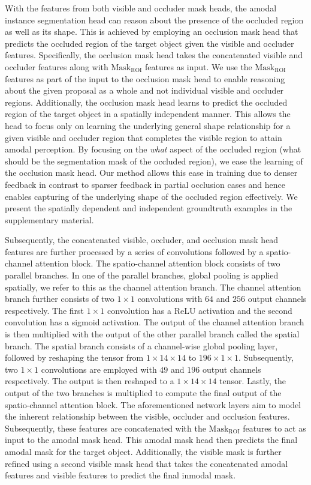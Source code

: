 \documentclass[10pt,twocolumn,letterpaper]{article}
\begin{document}
With the features from both visible and occluder mask heads, the amodal instance segmentation head can reason about the presence of the occluded region as well as its shape. This is achieved by employing an occlusion mask head that predicts the occluded region of the target object given the visible and occluder features. Specifically, the occlusion mask head takes the concatenated visible and occluder features along with $\text{Mask}_{\text{ROI}}$ features as input. We use the $\text{Mask}_{\text{ROI}}$ features as part of the input to the occlusion mask head to enable reasoning about the given proposal as a whole and not individual visible and occluder regions. Additionally, the occlusion mask head learns to predict the occluded region of the target object in a spatially independent manner. This allows the head to focus only on learning the underlying general shape relationship for a given visible and occluder region that completes the visible region to attain amodal perception. By focusing on the \textit{what} aspect of the occluded region (what should be the segmentation mask of the occluded region), we ease the learning of the occlusion mask head. Our method allows this ease in training due to denser feedback in contrast to sparser feedback in partial occlusion cases and hence enables capturing of the underlying shape of the occluded region effectively. We present the spatially dependent and independent groundtruth examples in the supplementary material.

Subsequently, the concatenated visible, occluder, and occlusion mask head features are further processed by a series of convolutions followed by a spatio-channel attention block. The spatio-channel attention block consists of two parallel branches. In one of the parallel branches, global pooling is applied spatially, we refer to this as the channel attention branch. The channel attention branch further consists of two $1\times1$ convolutions with $64$ and $256$ output channels respectively. The first $1\times1$ convolution has a ReLU activation and the second convolution has a sigmoid activation. The output of the channel attention branch is then multiplied with the output of the other parallel branch called the spatial branch. The spatial branch consists of a channel-wise global pooling layer, followed by reshaping the tensor from $1\times 14\times 14$ to $196\times1\times1$. Subsequently, two $1\times1$ convolutions are employed with $49$ and $196$ output channels respectively. The output is then reshaped to a $1\times 14\times 14$ tensor. Lastly, the output of the two branches is multiplied to compute the final output of the spatio-channel attention block. The aforementioned network layers aim to model the inherent relationship between the visible, occluder and occlusion features. Subsequently, these features are concatenated with the $\text{Mask}_{\text{ROI}}$ features to act as input to the amodal mask head. This amodal mask head then predicts the final amodal mask for the target object. Additionally, the visible mask is further refined using a second visible mask head that takes the concatenated amodal features and visible features to predict the final inmodal mask.
\end{document}
